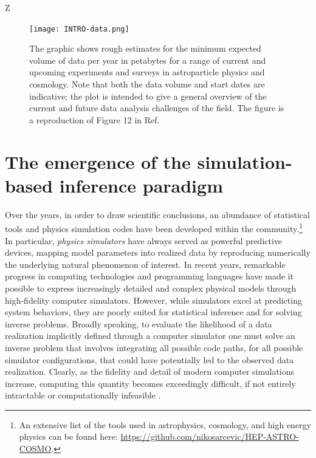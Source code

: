 Z\begin{figure}
    \centering
	\texttt{[image: INTRO-data.png]}
    \caption{The graphic shows rough estimates for the minimum expected volume of data per year in petabytes for a range of current and upcoming experiments and surveys in astroparticle physics and cosmology. Note that both the data volume and start dates are indicative; the plot is intended to give a general overview of the current and future data analysis challenges of the field. The figure is a reproduction of Figure 12 in Ref.~\cite{AlvesBatista:2021eeu}}
    \label{fig:intro-data}
\end{figure}











\clearpage
\section{The emergence of the simulation-based inference paradigm} \label{sec:paradigm}

Over the years, in order to draw scientific conclusions, an abundance of statistical tools and physics simulation codes have been developed within the community.\footnote{An extensive list of the tools used in astrophysics, cosmology, and high energy physics can be found here: \url{https://github.com/nikosarcevic/HEP-ASTRO-COSMO}.}
In particular, \emph{physics simulators} have always served as powerful predictive devices, mapping model parameters into realized data by reproducing numerically the underlying natural phenomenon of interest.
In recent years, remarkable progress in computing technologies and programming languages have made it possible to express increasingly detailed and complex physical models through high-fidelity computer simulators. However, while simulators excel at predicting system behaviors, they are poorly suited for statistical inference and for solving inverse problems. 
Broadly speaking, to evaluate the likelihood of a data realization implicitly defined through a computer simulator one must solve an inverse problem that involves integrating all possible code paths, for all possible simulator configurations, that could have potentially led to the observed data realization. Clearly, as the fidelity and detail of modern computer simulations increase, computing this quantity becomes exceedingly difficult, if not entirely intractable or computationally infeasible  \cite{Cranmer:2019eaq}. 

